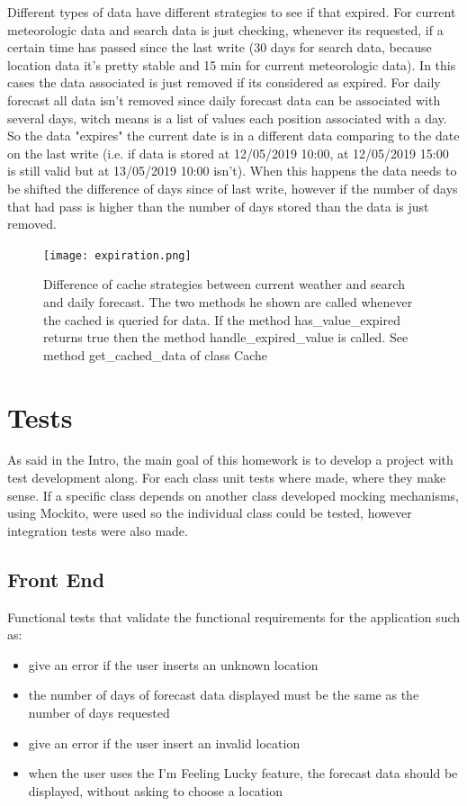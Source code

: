 \documentclass[12pt]{article}
\begin{document}
Different types of data have different strategies to see if that expired. For current meteorologic data
  and search data is just checking, whenever its requested, if a certain time has passed since the
  last write (30 days for search data, because location data it's pretty stable and 15 min for
  current meteorologic data). In this cases the data associated is just removed if its considered as
  expired. For daily forecast all data isn't removed since daily forecast data can be associated
  with several days, witch means is a list of values each position associated with a day. So the data
  "expires" the current date is in a different data comparing to the date on the last write (i.e. if
  data is stored at 12/05/2019 10:00, at 12/05/2019 15:00 is still valid but at 13/05/2019 10:00 isn't).
  When this happens the data needs to be shifted the difference of days since of last write, however if
  the number of days that had pass is higher than the number of days stored than the data is just removed.

\begin{figure}[h]
  \center
  \texttt{[image: expiration.png]}
  \caption{Difference of cache strategies between current weather and search and daily forecast.
    The two methods he shown are called whenever the cached is queried for data. If the
    method has\_value\_expired returns true then the method handle\_expired\_value is called. See
    method get\_cached\_data of class Cache}
\end{figure}

\section{Tests}

As said in the Intro, the main goal of this homework is to develop a project with
  test development along. For each class unit tests where made, where they make sense.
  If a specific class depends on another class developed mocking mechanisms, using Mockito,
  were used so the individual class could be tested, however integration tests were also made.

\subsection{Front End}

Functional tests that validate the functional requirements for the application such as:
\begin{itemize}
  \item give an error if the user inserts an unknown location
  \item the number of days of forecast data displayed must be the same as the number
    of days requested
  \item give an error if the user insert an invalid location
  \item when the user uses the I'm Feeling Lucky feature, the forecast data should be
    displayed, without asking to choose a location
\end{itemize}
\end{document}
